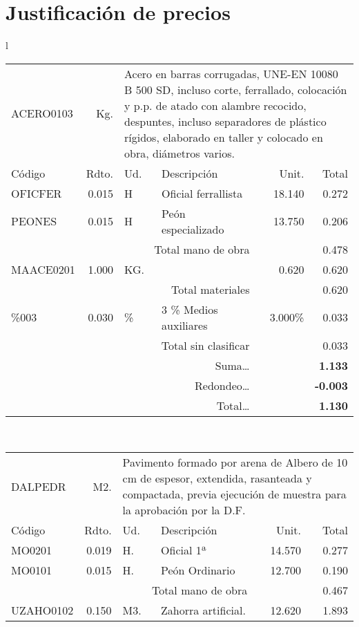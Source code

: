 \documentclass{book}%
\begin{document}
%
\normalsize%
\part{Justificación de precios}%
\label{sec:Justificacindeprecios}%
\small%
\begin{longtable}{l}%
\begin{tabular}{l r l p{4cm} r r}%
ACERO0103&Kg.&\multicolumn{4}{p{7cm}}{Acero en barras corrugadas, UNE{-}EN 10080 B 500 SD, incluso corte, ferrallado, colocación y p.p. de atado con alambre recocido, despuntes, incluso separadores de plástico rígidos, elaborado en taller y colocado en obra, diámetros varios.}\\%
Código&Rdto.&Ud.&Descripción&Unit.&Total\\%
\hline%
OFICFER&0.015&H&Oficial ferrallista&18.140&0.272\\%
PEONES&0.015&H&Peón especializado&13.750&0.206\\%
\multicolumn{4}{r}{Total mano de obra}&&0.478\\%
MAACE0201&1.000&KG.&&0.620&0.620\\%
\multicolumn{4}{r}{Total materiales}&&0.620\\%
\%003&0.030&\%&3 \% Medios auxiliares&3.000\%&0.033\\%
\multicolumn{4}{r}{Total sin clasificar}&&0.033\\%
\multicolumn{4}{r}{Suma\ldots}&\multicolumn{2}{r}{\textbf{1.133}}\\%
\multicolumn{4}{r}{Redondeo\ldots}&\multicolumn{2}{r}{\textbf{{-}0.003}}\\%
\multicolumn{4}{r}{Total\ldots}&\multicolumn{2}{r}{\textbf{1.130}}\\%
\end{tabular}\\%
\begin{tabular}{l r l p{4cm} r r}%
DALPEDR&M2.&\multicolumn{4}{p{7cm}}{Pavimento formado por arena de Albero de 10 cm de espesor, extendida, rasanteada y compactada, previa ejecución de muestra para la aprobación por la D.F.}\\%
Código&Rdto.&Ud.&Descripción&Unit.&Total\\%
\hline%
MO0201&0.019&H.&Oficial 1ª&14.570&0.277\\%
MO0101&0.015&H.&Peón Ordinario&12.700&0.190\\%
\multicolumn{4}{r}{Total mano de obra}&&0.467\\%
UZAHO0102&0.150&M3.&Zahorra artificial.&12.620&1.893\\%

\end{tabular}
\end{longtable}
\end{document}
